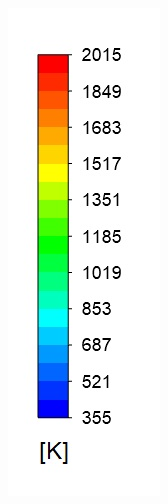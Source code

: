 \documentclass{webofc}
\begin{document}
\\
\begin{figure}[h!]
\centering
\includegraphics[scale = 0.3]{temp} 

\end{figure}
\end{document}
